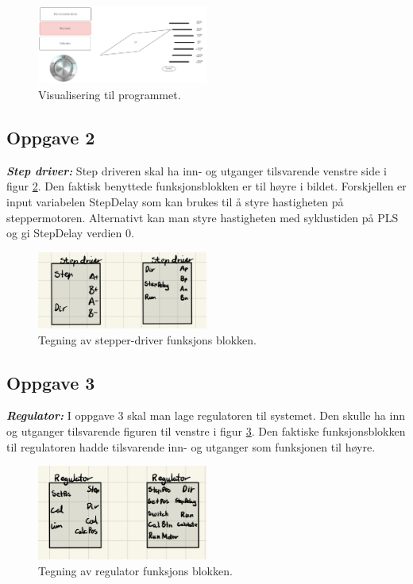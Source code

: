 \begin{figure}[h!]
    \centering
    \includegraphics[width = 0.5\textwidth]{Images/Visu.png}
    \caption{Visualisering til programmet.}
    \label{fig:Driver}
\end{figure}

\subsection{Oppgave 2}
\textbf{\textit{Step driver:}}
\newline
Step driveren skal ha inn- og utganger tilsvarende venstre side i figur \ref{fig:Driver}. Den faktisk benyttede funksjonsblokken er til høyre i bildet. Forskjellen er input variabelen StepDelay som kan brukes til å styre hastigheten på steppermotoren. Alternativt kan man styre hastigheten med syklustiden på PLS og gi  StepDelay verdien 0.

\begin{figure}[h!]
    \centering
    \includegraphics[width = 0.5\textwidth]{Images/Driver.jpeg}
    \caption{Tegning av stepper-driver funksjons blokken.}
    \label{fig:Driver}
\end{figure}

\subsection{Oppgave 3}
\textbf{\textit{Regulator:}}
\newline
I oppgave 3 skal man lage regulatoren til systemet. Den skulle ha inn og utganger tilsvarende figuren til venstre i figur \ref{fig:Regulator}. Den faktiske funksjonsblokken til regulatoren hadde tilsvarende inn- og utganger som funksjonen til høyre.

\begin{figure}[h!]
    \centering
    \includegraphics[width = 0.5\textwidth]{Images/Regulator.jpeg}
    \caption{Tegning av regulator funksjons blokken.}
    \label{fig:Regulator}
\end{figure}

